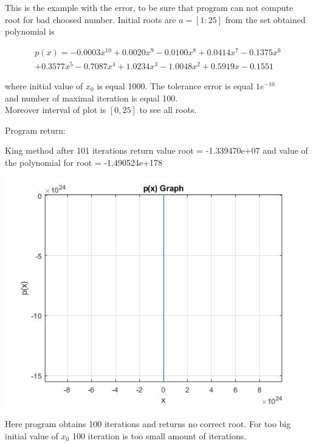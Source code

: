 \documentclass[12pt]{article}
\begin{document}
\begin{enumerate}
This is the example with the error, to be sure that program can not compute root for bad choosed number.
Initial roots are $a=[1:25]$ from the set obtained polynomial is

\begin{multline*}
p(x)=
   -0.0003    x^{10}  +0.0020   x^9  -0.0100    x^8  +0.0414   x^7  -0.1375
    x^6 \\ +0.3577   x^5  -0.7087  x^4  +1.0234   x^3  -1.0048    x^2  +0.5919  x  -0.1551
\end{multline*}

where initial value of $x_{0}$ is equal 1000.
The tolerance error is equal $1e^{-10}$ \\and number of maximal iteration is equal 100.
\\Moreover interval of plot is $[0,25]$ to see all roots. 

\end{enumerate}

\vskip20pt

Program return:
\begin{center}
King method after 101 iterations return value root = -1.339470e+07
and value of the polynomial for root = -1.490524e+178
\end{center}

\begin{center}
   \includegraphics[scale=0.6]{Example_4.jpg}
\end{center}

Here program obtains 100 iterations and returns no correct root. For too big initial value of $x_{0}$ 100 iteration is too small amount of iterations.
\end{document}
